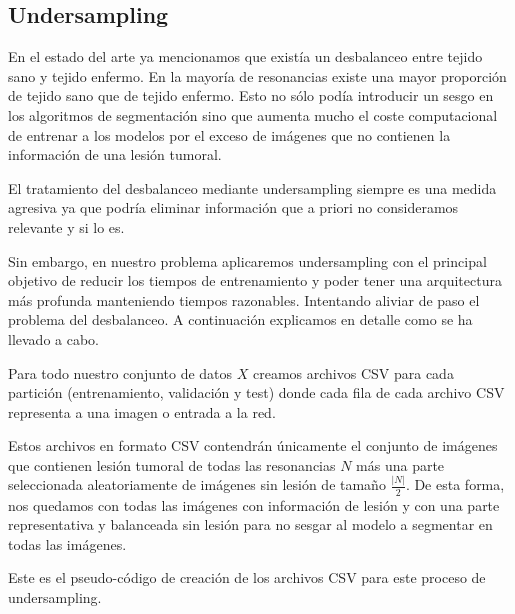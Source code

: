 \subsection{Undersampling}

En el estado del arte ya mencionamos que existía un desbalanceo entre tejido sano y tejido enfermo. En la mayoría de resonancias existe una mayor proporción de tejido sano que de tejido enfermo. Esto no sólo podía introducir un sesgo en los algoritmos de segmentación sino que aumenta mucho el coste computacional de entrenar a los modelos por el exceso de imágenes que no contienen la información de una lesión tumoral. 

El tratamiento del desbalanceo mediante undersampling siempre es una medida agresiva ya que podría eliminar información que a priori no consideramos relevante y si lo es.

Sin embargo, en nuestro problema aplicaremos undersampling con el principal objetivo de reducir los tiempos de entrenamiento y poder tener una arquitectura más profunda manteniendo tiempos razonables. Intentando aliviar de paso el problema del desbalanceo.
A continuación explicamos en detalle como se ha llevado a cabo.

Para todo nuestro conjunto de datos $X$ creamos archivos CSV para cada partición (entrenamiento, validación y test) donde cada fila de cada archivo CSV representa a una imagen o entrada a la red. 

Estos archivos en formato CSV contendrán únicamente el conjunto de imágenes que contienen lesión tumoral de todas las resonancias $N$ más una parte seleccionada aleatoriamente de imágenes sin lesión de tamaño $\frac{|N|}{2}$. De esta forma, nos quedamos con todas las imágenes con información de lesión y con una parte representativa y balanceada sin lesión para no sesgar al modelo a segmentar en todas las imágenes.

Este es el pseudo-código de creación de los archivos CSV para este proceso de undersampling. 

